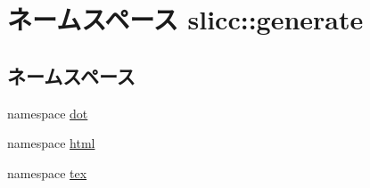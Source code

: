 \hypertarget{namespaceslicc_1_1generate}{
\section{ネームスペース slicc::generate}
\label{namespaceslicc_1_1generate}
}
\subsection*{ネームスペース}
\begin{DoxyCompactItemize}
\item 
namespace \hyperlink{namespaceslicc_1_1generate_1_1dot}{dot}
\item 
namespace \hyperlink{namespaceslicc_1_1generate_1_1html}{html}
\item 
namespace \hyperlink{namespaceslicc_1_1generate_1_1tex}{tex}
\end{DoxyCompactItemize}

